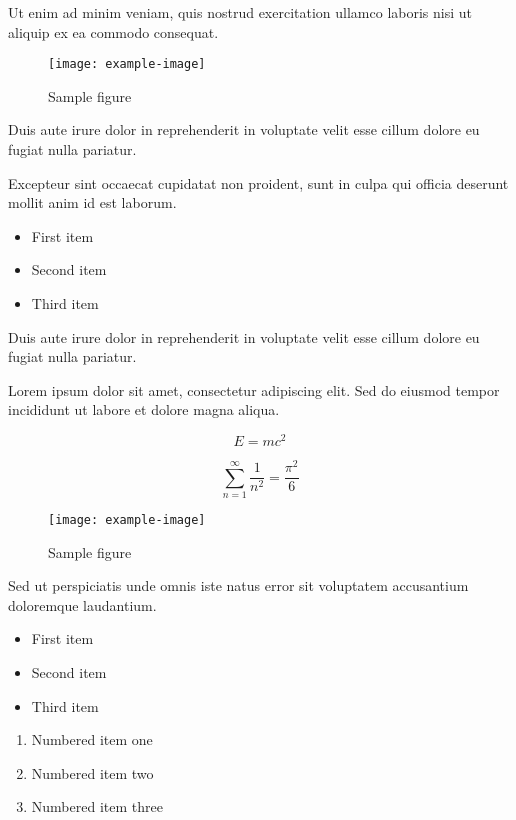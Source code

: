 \documentclass{article}
\begin{document}
Ut enim ad minim veniam, quis nostrud exercitation ullamco laboris nisi ut aliquip ex ea commodo consequat.

\begin{figure}[h]
    \centering
    \texttt{[image: example-image]}
    \caption{Sample figure}
    \label{fig:sample}
\end{figure}

Duis aute irure dolor in reprehenderit in voluptate velit esse cillum dolore eu fugiat nulla pariatur.

Excepteur sint occaecat cupidatat non proident, sunt in culpa qui officia deserunt mollit anim id est laborum.

\begin{itemize}
\item First item
\item Second item
\item Third item
\end{itemize}

Duis aute irure dolor in reprehenderit in voluptate velit esse cillum dolore eu fugiat nulla pariatur.

Lorem ipsum dolor sit amet, consectetur adipiscing elit. Sed do eiusmod tempor incididunt ut labore et dolore magna aliqua.

\begin{equation}
    E = mc^2
\end{equation}

\begin{equation}
    \sum_{n=1}^{\infty} \frac{1}{n^2} = \frac{\pi^2}{6}
\end{equation}


\begin{figure}[h]
    \centering
    \texttt{[image: example-image]}
    \caption{Sample figure}
    \label{fig:sample}
\end{figure}

Sed ut perspiciatis unde omnis iste natus error sit voluptatem accusantium doloremque laudantium.

\begin{itemize}
\item First item
\item Second item
\item Third item
\end{itemize}

\begin{enumerate}
\item Numbered item one
\item Numbered item two
\item Numbered item three
\end{enumerate}
\end{document}
